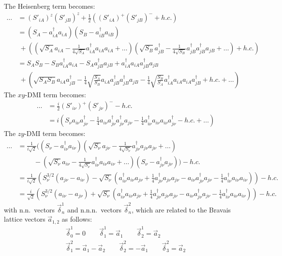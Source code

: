 \documentclass{article}
\begin{document}
The Heisenberg term becomes:
\begin{align}
	\dots &= (S'_{iA})^z (S'_{jB})^z + \frac{1}{2} ((S'_{iA})^+ (S'_{jB})^- + h.c.) \\
%
	&= (S_A - a_{iA}^\dagger a_{iA}) (S_B - a_{iB}^\dagger a_{iB}) \\
	&\ + \left( \left(\sqrt{S_A} a_{iA} - \frac{1}{4\sqrt{S_A}} a_{iA}^\dagger a_{iA} a_{iA} + \dots \right) \left(\sqrt{S_B} a^\dagger_{jB} - \frac{1}{4\sqrt{S_B}} a_{jB}^\dagger a^\dagger_{jB} a_{jB} + \dots \right) + h.c. \right) \\
%
	&= S_A S_B - S_B a_{iA}^\dagger a_{iA} - S_A a_{jB}^\dagger a_{jB} + a_{iA}^\dagger a_{iA} a_{jB}^\dagger a_{jB} \\
	&\ + \left(\sqrt{S_A S_B} a_{iA} a_{jB}^\dagger - \frac{1}{4}\sqrt{\frac{S_A}{S_B}} a_{iA} a_{jB}^\dagger a_{jB}^\dagger a_{jB} - \frac{1}{4}\sqrt{\frac{S_B}{S_A}} a_{iA}^\dagger a_{iA} a_{iA} a_{jB}^\dagger + h.c. + \dots \right)
\end{align}
The $xy$-DMI term becomes:
\begin{align}
	\dots &= \frac{i}{2} (S'_{i\nu})^+ (S'_{j\nu})^- - h.c. \\
%
	&= i \left(S_\nu a_{i\nu} a_{j\nu}^\dagger - \frac{1}{4} a_{i\nu} a_{j\nu}^\dagger a_{j\nu}^\dagger a_{j\nu} - \frac{1}{4} a_{i\nu}^\dagger a_{i\nu} a_{i\nu} a_{j\nu}^\dagger - h.c. + \dots \right)
\end{align}
The $zy$-DMI term becomes:
\begin{align}
	\dots &= \frac{1}{i\sqrt 2} \bigg((S_\nu - a_{i\nu}^\dagger a_{i\nu}) \left(\sqrt{S_\nu} a_{j\nu} - \frac{1}{4\sqrt{S_\nu}} a_{j\nu}^\dagger a_{j\nu} a_{j\nu} + \dots \right) \\
	&\hspace{1cm} - \left(\sqrt{S_\nu} a_{i\nu} - \frac{1}{4\sqrt{S_\nu}} a_{i\nu}^\dagger a_{i\nu} a_{i\nu} + \dots \right) (S_\nu - a_{j\nu}^\dagger a_{j\nu}) \bigg) - h.c. \\
%
	&= \frac{1}{i\sqrt 2} \left(S_\nu^{3/2} (a_{j\nu} - a_{i\nu}) - \sqrt{S_\nu} \left(a_{i\nu}^\dagger a_{i\nu} a_{j\nu} + \frac{1}{4} a_{j\nu}^\dagger a_{j\nu} a_{j\nu} - a_{i\nu} a_{j\nu}^\dagger a_{j\nu} - \frac{1}{4} a_{i\nu}^\dagger a_{i\nu} a_{i\nu} \right) \right) - h.c. \\
%
	&= \frac{i}{\sqrt 2} \left(S_\nu^{3/2} (a_{i\nu} - a_{j\nu}) + \sqrt{S_\nu} \left(a_{i\nu}^\dagger a_{i\nu} a_{j\nu} + \frac{1}{4} a_{j\nu}^\dagger a_{j\nu} a_{j\nu} - a_{i\nu} a_{j\nu}^\dagger a_{j\nu} - \frac{1}{4} a_{i\nu}^\dagger a_{i\nu} a_{i\nu} \right) \right) - h.c.
\end{align}
with n.n.\ vectors $\vec \delta^1_n$ and n.n.n.\ vectors $\vec \delta^2_n$, which are related to the Bravais lattice vectors $\vec a_{1,2}$ as follows:
\begin{gather}
	\vec\delta^1_0 = 0 \qquad \vec\delta^1_1 = \vec a_1 \qquad \vec\delta^1_2 = \vec a_2 \\
%
	\vec\delta^2_1 = \vec a_1 - \vec a_2 \qquad \vec\delta^2_2 = -\vec a_1 \qquad \vec\delta^2_3 = \vec a_2
\end{gather}
\end{document}
